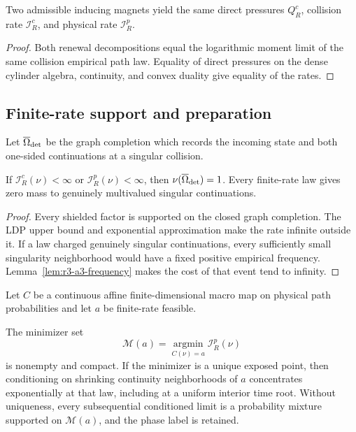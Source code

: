 \begin{proposition}
\label{prop:r3-a3-independent}
Two admissible inducing magnets yield the same direct pressures
\(Q_R^c\), collision rate \(\mathcal I_R^c\), and physical rate
\(\mathcal I_R^p\).
\end{proposition}

\begin{proof}
Both renewal decompositions equal the logarithmic moment limit of the same
collision empirical path law.  Equality of direct pressures on the dense
cylinder algebra, continuity, and convex duality give equality of the rates.
\end{proof}

\subsection{Finite-rate support and preparation}

Let \(\overline\Omega_{\rm det}\) be the graph completion which records the
incoming state and both one-sided continuations at a singular collision.

\begin{proposition}
\label{prop:r3-a3-support}
If \(\mathcal I_R^c(\nu)<\infty\) or \(\mathcal I_R^p(\nu)<\infty\), then
\(\nu(\overline\Omega_{\rm det})=1\).  Every finite-rate law gives zero mass
to genuinely multivalued singular continuations.
\end{proposition}

\begin{proof}
Every shielded factor is supported on the closed graph completion.  The LDP
upper bound and exponential approximation make the rate infinite outside it.
If a law charged genuinely singular continuations, every sufficiently small
singularity neighborhood would have a fixed positive empirical frequency.
Lemma~\ref{lem:r3-a3-frequency} makes the cost of that event tend to infinity.
\end{proof}

Let \(C\) be a continuous affine finite-dimensional macro map on physical
path probabilities and let \(a\) be finite-rate feasible.

\begin{theorem}
\label{thm:r3-a3-projection}
The minimizer set
\[
 \mathcal M(a)=\operatorname*{argmin}_{C(\nu)=a}\mathcal I_R^p(\nu)
\]
is nonempty and compact.  If the minimizer is a unique exposed point, then
conditioning on shrinking continuity neighborhoods of \(a\) concentrates
exponentially at that law, including at a uniform interior time root.  Without
uniqueness, every subsequential conditioned limit is a probability mixture
supported on \(\mathcal M(a)\), and the phase label is retained.
\end{theorem}

